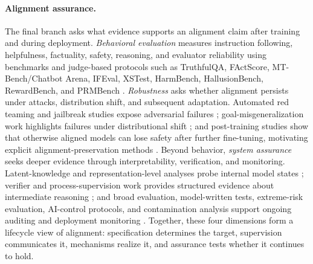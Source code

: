 \documentclass[10pt,a4paper,twocolumn]{article}
\begin{document}
\paragraph{Alignment assurance.}
The final branch asks what evidence supports an alignment claim after training and during deployment. \emph{Behavioral evaluation} measures instruction following, helpfulness, factuality, safety, reasoning, and evaluator reliability using benchmarks and judge-based protocols such as TruthfulQA, FActScore, MT-Bench/Chatbot Arena, IFEval, XSTest, HarmBench, HallusionBench, RewardBench, and PRMBench \citep{lin2022truthfulqa,min2023factscore,zheng2023mtbench,zhou2023ifeval,chiang2024arena,rottger2024xstest,mazeika2024harmbench,guan2024hallusionbench,lambert2025rewardbench,song2025prmbench}. \emph{Robustness} asks whether alignment persists under attacks, distribution shift, and subsequent adaptation. Automated red teaming and jailbreak studies expose adversarial failures \citep{perez2022redteaming,zou2023jailbreak,mazeika2024harmbench,souly2024strongreject,zou2024circuitbreakers}; goal-misgeneralization work highlights failures under distributional shift \citep{langosco2022goal,shah2022goal}; and post-training studies show that otherwise aligned models can lose safety after further fine-tuning, motivating explicit alignment-preservation methods \citep{qi2024finetuning,zhang2025copr,wang2025lifelong}. Beyond behavior, \emph{system assurance} seeks deeper evidence through interpretability, verification, and monitoring. Latent-knowledge and representation-level analyses probe internal model states \citep{burns2023latent,li2023iti,rimsky2024caa}; verifier and process-supervision work provides structured evidence about intermediate reasoning \citep{uesato2022process,lightman2024verify,kirchner2024proververifier}; and broad evaluation, model-written tests, extreme-risk evaluation, AI-control protocols, and contamination analysis support ongoing auditing and deployment monitoring \citep{liang2023helm,perez2023modelwritten,shevlane2023extremerisks,greenblatt2024control,oren2024contamination}. Together, these four dimensions form a lifecycle view of alignment: specification determines the target, supervision communicates it, mechanisms realize it, and assurance tests whether it continues to hold.



\end{document}

